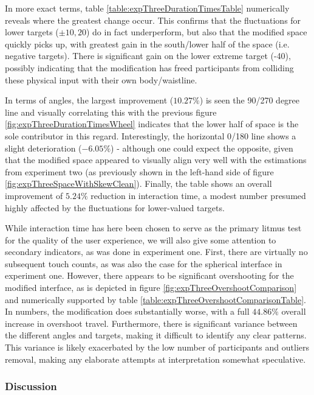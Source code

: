 In more exact terms, table \ref{table:expThreeDurationTimesTable} numerically reveals where the greatest change occur. This confirms that the fluctuations for lower targets ($\pm10, 20$) do in fact underperform, but also that the modified space quickly picks up, with greatest gain in the south/lower half of the space (i.e. negative targets). There is significant gain on the lower extreme target (-40), possibly indicating that the modification has freed participants from colliding these physical input with their own body/waistline. 

In terms of angles, the largest improvement ($10.27\%$) is seen the 90/270 degree line and visually correlating this with the previous figure  \ref{fig:expThreeDurationTimesWheel} indicates that the lower half of space is the sole contributor in this regard. Interestingly, the horizontal 0/180 line shows a slight deterioration ($-6.05\%$) - although one could expect the opposite, given that the modified space appeared to visually align very well with the estimations from experiment two (as previously shown in the left-hand side of figure \ref{fig:expThreeSpaceWithSkewClean}). Finally, the table shows an overall improvement of $5.24\%$ reduction in interaction time, a modest number presumed highly affected by the fluctuations for lower-valued targets.


While interaction time has here been chosen to serve as  the primary litmus test for the  quality of the user experience, we will also give some attention to secondary indicators, as was done in experiment one. First, there are virtually no subsequent touch  counts, as was also the case for the spherical interface in experiment one. However, there appears to be significant overshooting for the modified interface, as is depicted in figure  \ref{fig:expThreeOvershootComparison} and numerically supported by table \ref{table:expThreeOvershootComparisonTable}. In numbers, the modification does substantially worse, with a full $44.86\%$ overall increase in overshoot travel. Furthermore, there is significant variance between the different angles and targets, making it difficult to identify any clear patterns. This variance is likely exacerbated by the low number of participants and outliers removal, making any elaborate  attempts at interpretation somewhat speculative.


\subsubsection{Discussion}

